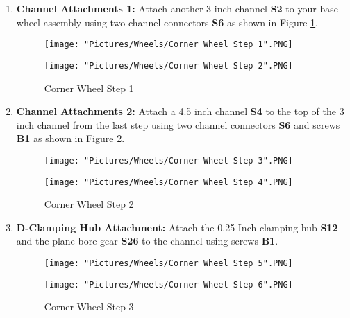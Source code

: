\documentclass[12pt]{article}
\begin{document}
\begin{enumerate}
\item \textbf{Channel Attachments 1:} Attach another 3 inch channel \textbf{S2} to your base wheel assembly using two channel connectors \textbf{S6} as shown in Figure \ref{corner wheel step 1}.

\begin{figure}[H]
  \centering
  \begin{minipage}[b]{0.45\textwidth}
    \texttt{[image: "Pictures/Wheels/Corner Wheel Step 1".PNG]}
  \end{minipage}
  \hfill
  \begin{minipage}[b]{0.45\textwidth}
    \texttt{[image: "Pictures/Wheels/Corner Wheel Step 2".PNG]}
  \end{minipage}
  \caption{Corner Wheel Step 1}
  \label{corner wheel step 1}
\end{figure}

\item \textbf{Channel Attachments 2:} Attach a 4.5 inch channel \textbf{S4} to the top of the 3 inch channel from the last step using two channel connectors \textbf{S6} and screws \textbf{B1} as shown in Figure \ref{corner wheel step 2}.

\begin{figure}[H]
  \centering
  \begin{minipage}[b]{0.45\textwidth}
    \texttt{[image: "Pictures/Wheels/Corner Wheel Step 3".PNG]}
  \end{minipage}
  \hfill
  \begin{minipage}[b]{0.45\textwidth}
    \texttt{[image: "Pictures/Wheels/Corner Wheel Step 4".PNG]}
  \end{minipage}
  \caption{Corner Wheel Step 2}
  \label{corner wheel step 2}
\end{figure}

\item \textbf{D-Clamping Hub Attachment:} Attach the 0.25 Inch clamping hub \textbf{S12} and the plane bore gear \textbf{S26} to the channel using screws \textbf{B1}.

\begin{figure}[H]
  \centering
  \begin{minipage}[b]{0.45\textwidth}
    \texttt{[image: "Pictures/Wheels/Corner Wheel Step 5".PNG]}
  \end{minipage}
  \hfill
  \begin{minipage}[b]{0.45\textwidth}
    \texttt{[image: "Pictures/Wheels/Corner Wheel Step 6".PNG]}
  \end{minipage}
  \caption{Corner Wheel Step 3}
\end{figure}


\end{enumerate}
\end{document}
